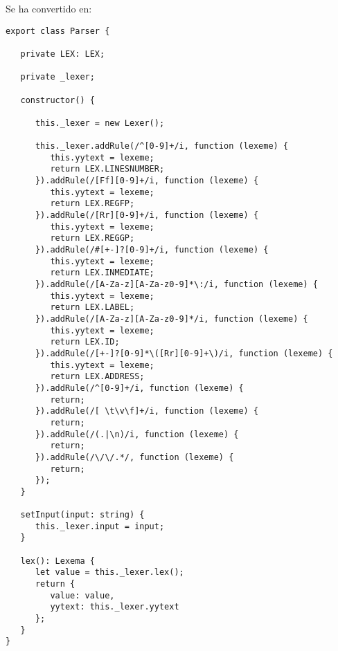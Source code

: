 Se ha convertido en: 

\begin{lstlisting}
export class Parser {

   private LEX: LEX;

   private _lexer;

   constructor() {

      this._lexer = new Lexer();

      this._lexer.addRule(/^[0-9]+/i, function (lexeme) {
         this.yytext = lexeme;
         return LEX.LINESNUMBER;
      }).addRule(/[Ff][0-9]+/i, function (lexeme) {
         this.yytext = lexeme;
         return LEX.REGFP;
      }).addRule(/[Rr][0-9]+/i, function (lexeme) {
         this.yytext = lexeme;
         return LEX.REGGP;
      }).addRule(/#[+-]?[0-9]+/i, function (lexeme) {
         this.yytext = lexeme;
         return LEX.INMEDIATE;
      }).addRule(/[A-Za-z][A-Za-z0-9]*\:/i, function (lexeme) {
         this.yytext = lexeme;
         return LEX.LABEL;
      }).addRule(/[A-Za-z][A-Za-z0-9]*/i, function (lexeme) {
         this.yytext = lexeme;
         return LEX.ID;
      }).addRule(/[+-]?[0-9]*\([Rr][0-9]+\)/i, function (lexeme) {
         this.yytext = lexeme;
         return LEX.ADDRESS;
      }).addRule(/^[0-9]+/i, function (lexeme) {
         return;
      }).addRule(/[ \t\v\f]+/i, function (lexeme) {
         return;
      }).addRule(/(.|\n)/i, function (lexeme) {
         return;
      }).addRule(/\/\/.*/, function (lexeme) {
         return;
      });
   }

   setInput(input: string) {
      this._lexer.input = input;
   }

   lex(): Lexema {
      let value = this._lexer.lex();
      return {
         value: value,
         yytext: this._lexer.yytext
      };
   }
}
\end{lstlisting}
